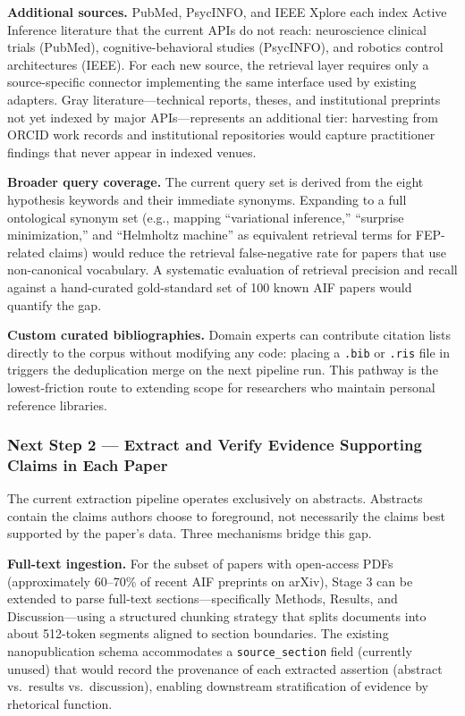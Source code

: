 \documentclass[
  english,
]{article}
\begin{document}
{{{{{{{{{{{{{{{{\textbf{Additional sources.} PubMed, PsycINFO, and IEEE Xplore each
index Active Inference literature that the current APIs do not reach:
neuroscience clinical trials (PubMed), cognitive-behavioral studies
(PsycINFO), and robotics control architectures (IEEE). For each new
source, the retrieval layer requires only a source-specific connector
implementing the same 
interface used by existing adapters. Gray literature---technical
reports, theses, and institutional preprints not yet indexed by major
APIs---represents an additional tier: harvesting from ORCID work records
and institutional repositories would capture practitioner findings that
never appear in indexed venues.

\textbf{Broader query coverage.} The current query set is derived from
the eight hypothesis keywords and their immediate synonyms. Expanding to
a full ontological synonym set (e.g., mapping ``variational inference,''
``surprise minimization,'' and ``Helmholtz machine'' as equivalent
retrieval terms for FEP-related claims) would reduce the retrieval
false-negative rate for papers that use non-canonical vocabulary. A
systematic evaluation of retrieval precision and recall against a
hand-curated gold-standard set of 100 known AIF papers would quantify
the gap.

\textbf{Custom curated bibliographies.} Domain experts can contribute
citation lists directly to the corpus without modifying any code:
placing a \texttt{.bib} or \texttt{.ris} file in
 triggers the deduplication merge
on the next pipeline run. This pathway is the lowest-friction route to
extending scope for researchers who maintain personal reference
libraries.

\subsubsection{Next Step 2 --- Extract and Verify Evidence Supporting
Claims in Each
Paper}\label{next-step-2-extract-and-verify-evidence-supporting-claims-in-each-paper}

The current extraction pipeline operates exclusively on abstracts.
Abstracts contain the claims authors choose to foreground, not
necessarily the claims best supported by the paper's data. Three
mechanisms bridge this gap.

\textbf{Full-text ingestion.} For the subset of papers with open-access
PDFs (approximately 60--70\% of recent AIF preprints on arXiv), Stage 3
can be extended to parse full-text sections---specifically Methods,
Results, and Discussion---using a structured chunking strategy that
splits documents into about 512-token segments aligned to
section boundaries. The existing nanopublication schema accommodates a
\texttt{source\_section} field (currently unused) that would record the
provenance of each extracted assertion (abstract vs.~results
vs.~discussion), enabling downstream stratification of evidence by
rhetorical function.

}}}}}}}}}}}}}}}}
\end{document}
